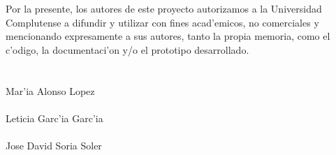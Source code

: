 Por la presente, los autores de este proyecto autorizamos a la Universidad Complutense a difundir y utilizar con fines acad'emicos, no comerciales y
mencionando expresamente a sus autores, tanto la propia memoria, como el c'odigo, la documentaci'on y/o el prototipo desarrollado.\bigskip \\
\bigskip \\ \bigskip \\
Mar'ia Alonso Lopez\bigskip \\ \bigskip \\
Leticia Garc'ia Garc'ia\bigskip \\ \bigskip \\
Jose David Soria Soler\bigskip \\ \bigskip \\


